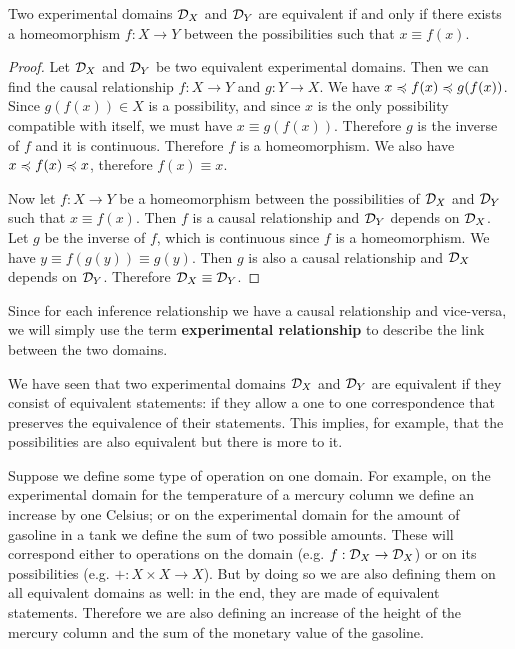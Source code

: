 \documentclass[11pt,letterpaper,fleqn]{memoir} %
\begin{document}
\begin{mathSection}
\begin{coro}
	Two experimental domains $\mathcal{D}_{X}$ and $\mathcal{D}_{Y}$ are equivalent if and only if there exists a homeomorphism $f : X \to Y$ between the possibilities such that $x \equiv f(x)$.
\end{coro}
\begin{proof}
	Let $\mathcal{D}_{X}$ and $\mathcal{D}_{Y}$ be two equivalent experimental domains. Then we can find the causal relationship $f : X \to Y$ and $g : Y \to X$. We have $x \preccurlyeq f(x) \preccurlyeq g(f(x))$. Since $g(f(x)) \in X$ is a possibility, and since $x$ is the only possibility compatible with itself, we must have $x \equiv g(f(x))$. Therefore $g$ is the inverse of $f$ and it is continuous. Therefore $f$ is a homeomorphism. We also have $x \preccurlyeq f(x) \preccurlyeq x$, therefore $f(x) \equiv x$.
	
	Now let $f : X \to Y$ be a homeomorphism between the possibilities of $\mathcal{D}_{X}$ and $\mathcal{D}_{Y}$ such that $x \equiv f(x)$. Then $f$ is a causal relationship and $\mathcal{D}_{Y}$ depends on $\mathcal{D}_{X}$. Let $g$ be the inverse of $f$, which is continuous since $f$ is a homeomorphism. We have $y \equiv f(g(y)) \equiv g(y)$. Then $g$ is also a causal relationship and $\mathcal{D}_{X}$ depends on $\mathcal{D}_{Y}$. Therefore $\mathcal{D}_{X} \equiv \mathcal{D}_{Y}$.
\end{proof}
\end{mathSection}

Since for each inference relationship we have a causal relationship and vice-versa, we will simply use the term \textbf{experimental relationship} to describe the link between the two domains.

We have seen that two experimental domains $\mathcal{D}_X$ and $\mathcal{D}_Y$ are equivalent if they consist of equivalent statements: if they allow a one to one correspondence that preserves the equivalence of their statements. This implies, for example, that the possibilities are also equivalent but there is more to it.

Suppose we define some type of operation on one domain. For example, on the experimental domain for the temperature of a mercury column we define an increase by one Celsius; or on the experimental domain for the amount of gasoline in a tank we define the sum of two possible amounts. These will correspond either to operations on the domain (e.g. $f : \mathcal{D}_X \to \mathcal{D}_X$) or on its possibilities (e.g. $+ : X \times X \to X$). But by doing so we are also defining them on all equivalent domains as well: in the end, they are made of equivalent statements. Therefore we are also defining an increase of the height of the mercury column and the sum of the monetary value of the gasoline.
\end{document}
